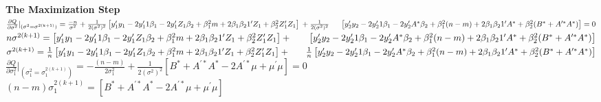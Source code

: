 \documentclass{article}\usepackage[]{graphicx}\usepackage[]{color}
\begin{document}
\textbf{The Maximization Step} \vspace{7mm}\\
$\frac{\partial Q}{\partial \sigma^{2}}|_{(\sigma^{2}=\sigma^{2(k+1)})}=\frac{-n}{\sigma^{2}}+\frac{1}{2(\sigma^{2})^{2}}\left[y_{1}^{\prime}y_{1}\\
-2y_{1}^{\prime}1\beta_{1} -2y_{1}^{\prime}Z_{1}\beta_{2}+\beta_{1}^{2}m+2\beta_{1}\beta_{2}1^{\prime}Z_{1}+\beta_{2}^{2}Z_{1}^{\prime}Z_{1}\right]\\
+\frac{1}{2(\sigma^{2})^{2}} 
\hspace{5mm}     \left[y_{2}^{\prime}y_{2} -2y_{2}^{\prime}1\beta_{1} -2y_{2}^{\prime}A^{*}\beta_{2}+\beta_{1}^{2}(n-m)+2\beta_{1}\beta_{2}1^{\prime}A^{*}+\beta_{2}^{2}(B^{*}+A^{\prime *}A^{*})\right]=0$\\


$n\sigma^{2(k+1)}=\left[y_{1}^{\prime}y_{1} \\
-2y_{1}^{\prime}1\beta_{1} -2y_{1}^{\prime}Z_{1}\beta_{2}+\beta_{1}^{2}m+2\beta_{1}\beta_{2}1^{\prime}Z_{1}+\beta_{2}^{2}Z_{1}^{\prime}Z_{1}\right]+\\\ 
\hspace{5mm}     \left[y_{2}^{\prime}y_{2} -2y_{2}^{\prime}1\beta_{1} -2y_{2}^{\prime}A^{*}\beta_{2}+\beta_{1}^{2}(n-m)+2\beta_{1}\beta_{2}1^{\prime}A^{*}+\beta_{2}^{2}(B^{*}+A^{\prime *}A^{*})\right]$\\

$\sigma^{2(k+1)}=\frac{1}{n}\left[y_{1}^{\prime}y_{1} \\
-2y_{1}^{\prime}1\beta_{1} -2y_{1}^{\prime}Z_{1}\beta_{2}+\beta_{1}^{2}m+2\beta_{1}\beta_{2}1^{\prime}Z_{1}+\beta_{2}^{2}Z_{1}^{\prime}Z_{1}\right]+\\\ 
\hspace{5mm}     \frac{1}{n}\left[y_{2}^{\prime}y_{2} -2y_{2}^{\prime}1\beta_{1} -2y_{2}^{\prime}A^{*}\beta_{2}+\beta_{1}^{2}(n-m)+2\beta_{1}\beta_{2}1^{\prime}A^{*}+\beta_{2}^{2}(B^{*}+A^{\prime *}A^{*})\right]$ \vspace{5mm}\\


$\frac{\partial Q}{\partial \sigma^{2}_{1}}|_{(\sigma^{2}_{1}=\sigma^{2(k+1)}_{1})}
=-\frac{(n-m)}{2\sigma^{2}_{1}}+\frac{1}{2(\sigma^{2})^{2}}\left[B^{*}+A^{\prime *}A^{*}-2A^{\prime *}\mu+\mu^{\prime}\mu  \right]=0$ \vspace{5mm}\\




$(n-m)\sigma_{1}^{2(k+1)}=\left[B^{*}+A^{\prime *}A^{*}-2A^{\prime *}\mu+\mu^{\prime}\mu  \right]$ \vspace{5mm}\\
\end{document}

